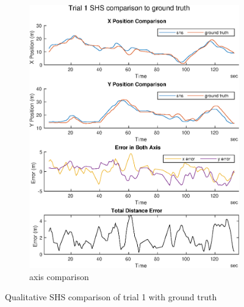 \begin{figure}[H]
\begin{subfigure}[t]{.45\textwidth}
		\includegraphics[width=\linewidth]{images/20201029_1040_trial1_shs_2}
		\caption{axis comparison}
		\label{fig:trial1_comparison}
	\end{subfigure}
	\caption{Qualitative SHS comparison of trial 1 with ground truth}
	\label{fig:trial1_shs_gt_comparison}
\end{figure}

